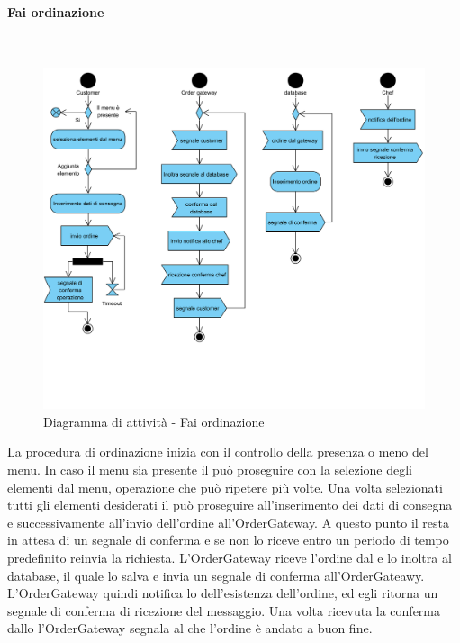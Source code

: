 \paragraph{Fai ordinazione}\mbox{}\\
\nopagebreak
\begin{figure}[H]
	\centering
	\includegraphics[width=14cm]{diagrammi_img/attivita/customer_ordinazione.png}
	\caption{Diagramma di attività - Fai ordinazione}
\end{figure}
La procedura di ordinazione inizia con il controllo della presenza o meno del menu. In caso il menu sia presente il \Customer{} può proseguire con la selezione degli elementi dal menu, operazione che può ripetere più volte. Una volta selezionati tutti gli elementi desiderati il \Customer{} può proseguire all'inserimento dei dati di consegna e successivamente all'invio dell'ordine all'OrderGateway. A questo punto il \Customer{} resta in attesa di un segnale di conferma e se non lo riceve entro un periodo di tempo predefinito reinvia la richiesta. L'OrderGateway riceve l'ordine dal \Customer{} e lo inoltra al database, il quale lo salva e invia un segnale di conferma all'OrderGateawy. L'OrderGateway quindi notifica lo \Chef{} dell'esistenza dell'ordine, ed egli ritorna un segnale di conferma di ricezione del messaggio. Una volta ricevuta la conferma dallo \Chef{} l'OrderGateway segnala al \Customer{} che l'ordine è andato a buon fine.

